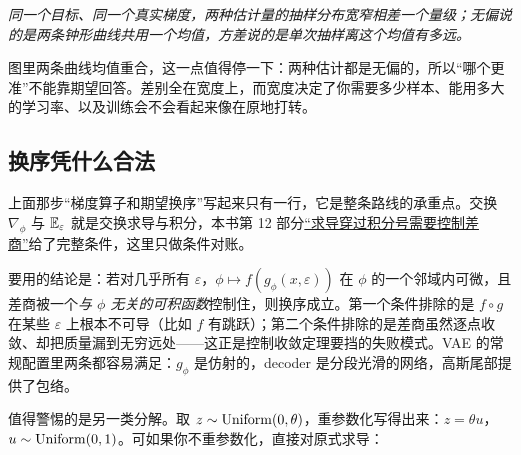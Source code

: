 \begin{center}

\emph{同一个目标、同一个真实梯度，两种估计量的抽样分布宽窄相差一个量级；无偏说的是两条钟形曲线共用一个均值，方差说的是单次抽样离这个均值有多远。}
\end{center}

图里两条曲线均值重合，这一点值得停一下：两种估计都是无偏的，所以``哪个更准''不能靠期望回答。差别全在宽度上，而宽度决定了你需要多少样本、能用多大的学习率、以及训练会不会看起来像在原地打转。

\subsection{换序凭什么合法}

上面那步``梯度算子和期望换序''写起来只有一行，它是整条路线的承重点。交换 \(\nabla_\phi\) 与 \(\mathbb{E}_\varepsilon\) 就是交换求导与积分，本书第 12 部分\hyperref[sec:12-Real-Analysis-Support/04-Limits-and-Integration/03]{``求导穿过积分号需要控制差商''}给了完整条件，这里只做条件对账。

要用的结论是：若对几乎所有 \(\varepsilon\)，\(\phi\mapsto f(g_\phi(x,\varepsilon))\) 在 \(\phi\) 的一个邻域内可微，且差商被一个\emph{与 \(\phi\) 无关的可积函数}控制住，则换序成立。第一个条件排除的是 \(f\circ g\) 在某些 \(\varepsilon\) 上根本不可导（比如 \(f\) 有跳跃）；第二个条件排除的是差商虽然逐点收敛、却把质量漏到无穷远处——这正是控制收敛定理要挡的失败模式。VAE 的常规配置里两条都容易满足：\(g_\phi\) 是仿射的，decoder 是分段光滑的网络，高斯尾部提供了包络。

值得警惕的是另一类分解。取 \(z\sim \operatorname{Uniform}(0,\theta)\)，重参数化写得出来：\(z=\theta u\)，\(u\sim\operatorname{Uniform}(0,1)\)。可如果你不重参数化，直接对原式求导：

